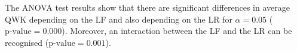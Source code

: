\documentclass[preprint]{elsarticle}
\begin{document}


The ANOVA test results show that there are significant differences in average QWK depending on the LF and also depending on the LR for $\alpha=0.05$ ($\text{p-value} = 0.000$). Moreover, an interaction between the LF and the LR can be recognised ($\text{p-value} = 0.001$).
\end{document}
